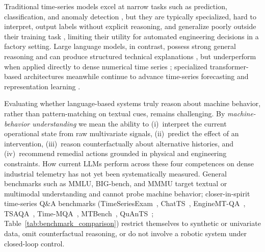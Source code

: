 \documentclass{article}
\begin{document}
Traditional time-series models excel at narrow tasks such as prediction, classification, and anomaly detection \cite{zhou2021informer,su2019omni,audibert2020usad}, but they are typically specialized, hard to interpret, output labels without explicit reasoning, and generalize poorly outside their training task \cite{chalapathy2019survey,lavin2015numenta,zeng2023transformers}, limiting their utility for automated engineering decisions in a factory setting. Large language models, in contrast, possess strong general reasoning and can produce structured technical explanations \cite{wei2022chain,yao2023tree}, but underperform when applied directly to dense numerical time series \cite{gruver2023llmtime,jin2024timellm}; specialized transformer-based architectures meanwhile continue to advance time-series forecasting and representation learning \cite{vaswani2017attention,zhou2021informer,wu2021autoformer,zhou2022fedformer,nie2022time,ansari2024chronos,das2024decoder,petersen2026hepaselfsupervisedhorizonconditionedevent}.

Evaluating whether language-based systems truly reason about machine behavior, rather than pattern-matching on textual cues, remains challenging. By \emph{machine-behavior understanding} we mean the ability to (i)~interpret the current operational state from raw multivariate signals, (ii)~predict the effect of an intervention, (iii)~reason counterfactually about alternative histories, and (iv)~recommend remedial actions grounded in physical and engineering constraints. How current LLMs perform across these four competences on dense industrial telemetry has not yet been systematically measured. General benchmarks such as MMLU, BIG-bench, and MMMU \cite{hendrycks2021mmlu,srivastava2023bigbench,yue2024mmmu} target textual or multimodal understanding and cannot probe machine behavior; closer-in-spirit time-series Q\&A benchmarks (TimeSeriesExam~\cite{cai2024timeseriesexamtimeseriesunderstanding}, ChatTS~\cite{Xie_2025}, EngineMT-QA~\cite{wang2025itformerbridgingtimeseries}, TSAQA~\cite{jing2026tsaqatimeseriesanalysis}, Time-MQA~\cite{kong2025timemqatimeseriesmultitask}, MTBench~\cite{chen2026mtbenchmultimodaltimeseries}, QuAnTS~\cite{wenkel2024quants}; Table~\ref{tab:benchmark_comparison}) restrict themselves to synthetic or univariate data, omit counterfactual reasoning, or do not involve a robotic system under closed-loop control.
\end{document}
